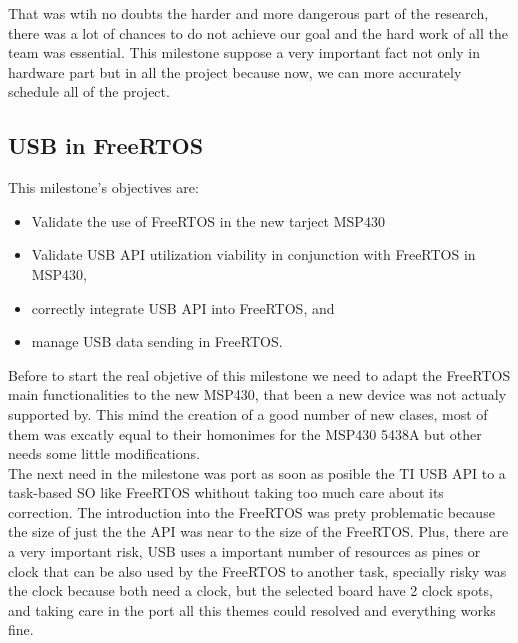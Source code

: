 		That was wtih no doubts the harder and more dangerous part of the research, there was a lot of chances to do not achieve our goal and the hard work of all the team was essential. This milestone suppose a very important fact not only in hardware part but in all the project because now, we can more accurately schedule all of the project. \\


		\subsection{USB in FreeRTOS}	
		This milestone's objectives are:
		\begin{itemize}
		\item Validate the use of FreeRTOS in the new tarject MSP430
		\item Validate USB API utilization viability in conjunction with FreeRTOS in MSP430,
		\item correctly integrate USB API into FreeRTOS, and
		\item manage USB data sending in FreeRTOS.
		\end{itemize}

		Before to start the real objetive of this milestone we need to adapt the FreeRTOS main functionalities to the new MSP430, that been a new device was not actualy supported by. This mind the creation of a good number of new clases, most of them was excatly equal to their homonimes for the MSP430 5438A but other needs some little modifications.\\

		The next need in the milestone was port as soon as posible the TI USB API to a task-based SO like FreeRTOS whithout taking too much care about its correction. The introduction into the FreeRTOS was prety problematic because the size of just the the API was near to the size of the FreeRTOS. Plus, there are a very important risk, USB uses a important number of resources as pines or clock that can be also used by the FreeRTOS to another task, specially risky was the clock because both need a clock, but the selected board have 2 clock spots, and taking care in the port all this themes could resolved and everything works fine.\\

